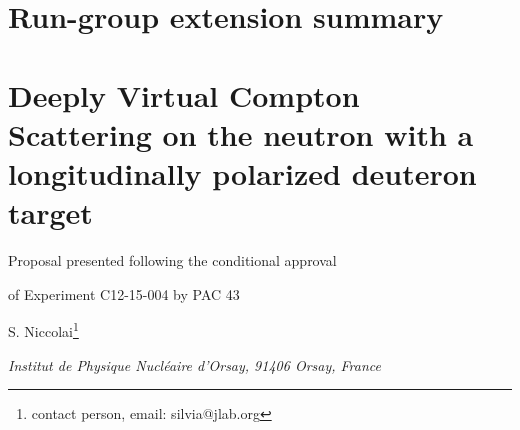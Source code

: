 \documentclass[a4paper,12pt]{report}
\begin{document}
\chapter{Run-group extension summary}

\newpage
\chapter{Deeply Virtual Compton Scattering on the neutron with a longitudinally polarized deuteron target}
\centerline{Proposal presented following the conditional approval}
\centerline{of Experiment C12-15-004 by PAC 43}
\vskip 0.4cm
\centerline{S. Niccolai\footnote{contact person, email: silvia@jlab.org}}
\centerline{\it Institut de Physique Nucl\'eaire d'Orsay, 91406 Orsay, France}
\end{document}
